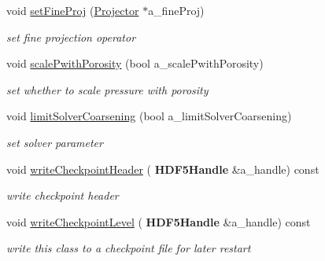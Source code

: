 \begin{DoxyCompactItemize}
void \hyperlink{class_projector_aafcccb9f646a75efa56c32c83e1a41c1}{set\+Fine\+Proj} (\hyperlink{class_projector}{Projector} $\ast$a\+\_\+fine\+Proj)
\begin{DoxyCompactList}\small\item\em set fine projection operator \end{DoxyCompactList}\item 
\mbox{\label{class_projector_a63b3df702c2b7993e4e9ae0e00bf59fa}} 
void \hyperlink{class_projector_a63b3df702c2b7993e4e9ae0e00bf59fa}{scale\+Pwith\+Porosity} (bool a\+\_\+scale\+Pwith\+Porosity)
\begin{DoxyCompactList}\small\item\em set whether to scale pressure with porosity \end{DoxyCompactList}\item 
\mbox{\label{class_projector_ada6c530003a482cac3285f0972961584}} 
void \hyperlink{class_projector_ada6c530003a482cac3285f0972961584}{limit\+Solver\+Coarsening} (bool a\+\_\+limit\+Solver\+Coarsening)
\begin{DoxyCompactList}\small\item\em set solver parameter \end{DoxyCompactList}\item 
\mbox{\label{class_projector_a10669de3b347ecc904938bfeda3fd70c}} 
void \hyperlink{class_projector_a10669de3b347ecc904938bfeda3fd70c}{write\+Checkpoint\+Header} (\textbf{ H\+D\+F5\+Handle} \&a\+\_\+handle) const
\begin{DoxyCompactList}\small\item\em write checkpoint header \end{DoxyCompactList}\item 
\mbox{\label{class_projector_a6c52b70f83d8f0c416ea16b81d63a50b}} 
void \hyperlink{class_projector_a6c52b70f83d8f0c416ea16b81d63a50b}{write\+Checkpoint\+Level} (\textbf{ H\+D\+F5\+Handle} \&a\+\_\+handle) const
\begin{DoxyCompactList}\small\item\em write this class to a checkpoint file for later restart \end{DoxyCompactList}\item 
\mbox{\label{class_projector_a26da7130c9aad23dd28488c305a8211c}} 

\end{DoxyCompactItemize}
